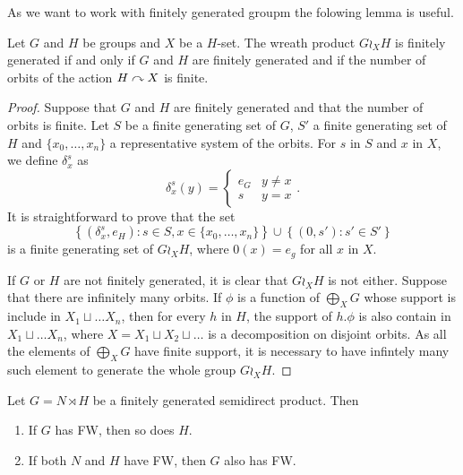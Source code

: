 As we want to work with finitely generated groupm the folowing lemma is useful.
%
%
\begin{lem}\label{L:wreath_fg}
Let $G$ and $H$ be groups and $X$ be a $H$-set. The wreath product $G \wr_X H$ is finitely generated if and only if $G$ and $H$ are finitely generated and if the number of orbits of the action $H \curvearrowright X$ is finite.
\end{lem}
%
\begin{proof}
Suppose that $G$ and $H$ are finitely generated and that the number of orbits is finite. Let $S$ be a finite generating set of $G$, $S'$ a finite generating set of $H$ and $\{x_0, \ldots, x_n \}$ a representative system of the orbits. For $s$ in $S$ and $x$ in $X$, we define $\delta_x^s$ as
%
\begin{equation*}
\delta_{x}^s (y) = \begin{cases} e_G & y \neq x \\ s 	& y = x \end{cases}.
\end{equation*}
%
It is straightforward to prove that the set 
\begin{equation*}
\left\{(\delta_x^s,e_H) : s \in S, x \in \{x_0,\ldots,x_n\} \right\} \cup \left\{ (0,s') : s' \in S' \right\}
\end{equation*}
is a finite generating set of $G \wr_X H$, where $0(x) = e_g$ for all $x$ in $X$.

If $G$ or $H$ are not finitely generated, it is clear that $G \wr_X H$ is not either. Suppose that there are infinitely many orbits. If $\phi$ is a function of $\bigoplus_X G$ whose support is include in $X_1 \sqcup \ldots X_n$, then for every $h$ in $H$, the support of $h.\phi$ is also contain in  $X_1 \sqcup \ldots X_n$, where $X = X_1 \sqcup X_2 \sqcup \ldots$ is a decomposition on disjoint orbits. As all the elements of $\bigoplus_X G$ have finite support, it is necessary to have infintely many such element to generate the whole group $G \wr_X H$.
\end{proof}
%
%
\begin{lem}\label{Lemma:Semidirect_ends}
Let $G = N \rtimes H$ be a finitely generated semidirect product. Then
\begin{enumerate}
\item If $G$ has FW, then so does $H$.
\item If both $N$ and $H$ have FW, then $G$ also has FW.
\end{enumerate}
\end{lem}
%
